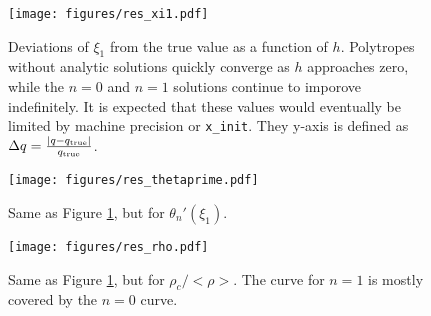 \documentclass[twocolumn]{aastex631}
\begin{document}
\begin{figure}[h]
    \begin{centering}
        \texttt{[image: figures/res\_xi1.pdf]}
        \caption{Deviations of $\xi_1$ from the true value as a
        function of $h$. Polytropes without analytic solutions
        quickly converge as $h$ approaches zero, while the
        $n=0$ and $n=1$ solutions continue to imporove indefinitely.
        It is expected that these values would eventually
        be limited by machine precision or \texttt{x\_init}.
        They y-axis is defined as
        $\Delta q = \frac{|q-q_{\rm true}|}{q_{\rm true}}$.
        }
        \label{fig:res_xi1}
    \end{centering}
\end{figure}

\begin{figure}[h]
    \begin{centering}
        \texttt{[image: figures/res\_thetaprime.pdf]}
        \caption{Same as Figure \ref{fig:res_xi1}, but for
        $\theta_n'(\xi_1)$.}
        \label{fig:res_thetaprime}
    \end{centering}
\end{figure}

\begin{figure}[h]
    \begin{centering}
        \texttt{[image: figures/res\_rho.pdf]}
        \caption{Same as Figure \ref{fig:res_xi1}, but for
        $\rho_c/<\rho>$. The curve for $n=1$ is mostly covered
        by the $n=0$ curve.}
        \label{fig:res_rho}
    \end{centering}
\end{figure}







\end{document}
